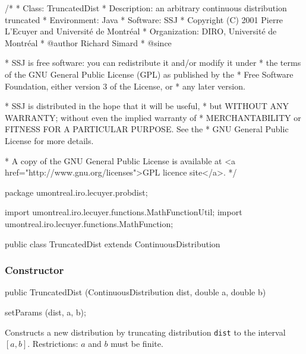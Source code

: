 \begin{code}
\begin{hide}
/*
 * Class:        TruncatedDist
 * Description:  an arbitrary continuous distribution truncated
 * Environment:  Java
 * Software:     SSJ 
 * Copyright (C) 2001  Pierre L'Ecuyer and Université de Montréal
 * Organization: DIRO, Université de Montréal
 * @author       Richard Simard
 * @since

 * SSJ is free software: you can redistribute it and/or modify it under
 * the terms of the GNU General Public License (GPL) as published by the
 * Free Software Foundation, either version 3 of the License, or
 * any later version.

 * SSJ is distributed in the hope that it will be useful,
 * but WITHOUT ANY WARRANTY; without even the implied warranty of
 * MERCHANTABILITY or FITNESS FOR A PARTICULAR PURPOSE.  See the
 * GNU General Public License for more details.

 * A copy of the GNU General Public License is available at
   <a href="http://www.gnu.org/licenses">GPL licence site</a>.
 */
\end{hide}
package umontreal.iro.lecuyer.probdist;\begin{hide}
import umontreal.iro.lecuyer.functions.MathFunctionUtil;
import umontreal.iro.lecuyer.functions.MathFunction;
\end{hide}

public class TruncatedDist extends ContinuousDistribution\begin{hide} {
   public static int NUMINTERVALS = 500;

   private ContinuousDistribution dist0;  // The original (non-truncated) dist.
   private double fa;                    // F(a)
   private double fb;                    // F(b)
   private double barfb;                 // bar F(b)
   private double fbfa;                  // F(b) - F(a)
   private double a;
   private double b;
   private double approxMean;
   private double approxVariance;
   private double approxStandardDeviation;\end{hide}
\end{code}
\subsubsection* {Constructor}

\begin{code}

   public TruncatedDist (ContinuousDistribution dist, double a, double b)\begin{hide} {
      setParams (dist, a, b);
   }\end{hide}
\end{code}
\begin{tabb}
  Constructs a new distribution by truncating distribution \texttt{dist}
  to the interval $[a,b]$. Restrictions: $a$ and $b$ must be finite.
\end{tabb}

